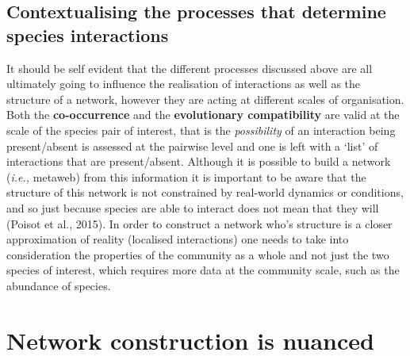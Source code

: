 \documentclass[
]{article}
\begin{document}
\subsection{Contextualising the processes that determine species
interactions}\label{contextualising-the-processes-that-determine-species-interactions}

It should be self evident that the different processes discussed above
are all ultimately going to influence the realisation of interactions as
well as the structure of a network, however they are acting at different
scales of organisation. Both the \textbf{co-occurrence} and the
\textbf{evolutionary compatibility} are valid at the scale of the
species pair of interest, that is the \emph{possibility} of an
interaction being present/absent is assessed at the pairwise level and
one is left with a `list' of interactions that are present/absent.
Although it is possible to build a network (\emph{i.e.,} metaweb) from
this information it is important to be aware that the structure of this
network is not constrained by real-world dynamics or conditions, and so
just because species are able to interact does not mean that they will
(Poisot et al., 2015). In order to construct a network who's structure
is a closer approximation of reality (localised interactions) one needs
to take into consideration the properties of the community as a whole
and not just the two species of interest, which requires more data at
the community scale, such as the abundance of species.

\section{Network construction is
nuanced}\label{network-construction-is-nuanced}
\end{document}
